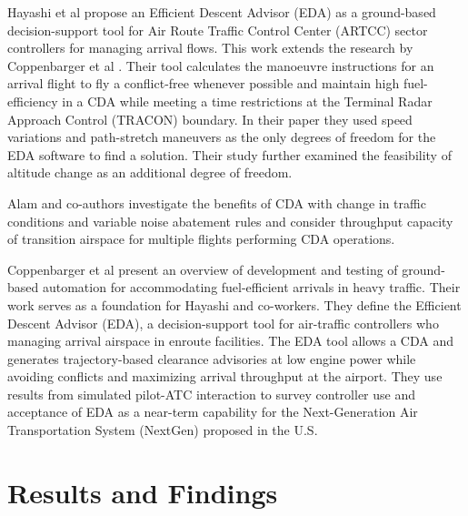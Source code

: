\documentclass{aer1315-pretty}
\begin{document}
Hayashi et al \cite{Hayashi:2011} propose an Efficient Descent Advisor (EDA) as a ground-based decision-support tool for Air Route Traffic Control Center (ARTCC) sector controllers for managing arrival flows. This work extends the research by Coppenbarger et al \cite{Copp:2010b}. Their tool calculates the manoeuvre instructions for an arrival flight to fly a conflict-free whenever possible and maintain high fuel-efficiency in a CDA while meeting a time restrictions at the Terminal Radar Approach Control (TRACON) boundary. In their paper they used speed variations and path-stretch maneuvers as the only degrees of freedom for the EDA software to find a solution. Their study further examined the feasibility of altitude change as an additional degree of freedom. \par

Alam and co-authors \cite{Alam:2010} investigate the benefits of CDA with change in traffic conditions and variable noise abatement rules and consider throughput capacity of transition airspace for multiple flights performing CDA operations. \par


Coppenbarger et al \cite{Copp:2010b} present an overview of development and testing of ground-based automation for accommodating fuel-efficient arrivals in heavy traffic. Their work serves as a foundation for Hayashi and co-workers\cite{Hayashi:2011}. They define the Efficient Descent Advisor (EDA), a decision-support tool for air-traffic controllers who managing arrival airspace in enroute facilities. The EDA tool allows a CDA and generates trajectory-based clearance advisories at low engine power while avoiding conflicts and maximizing arrival throughput at the airport. They use results from simulated pilot-ATC interaction to survey controller use and acceptance of EDA as a near-term capability for the Next-Generation Air Transportation System (NextGen) proposed in the U.S. \par


\section{Results and Findings} \label{sec:results}
\end{document}
